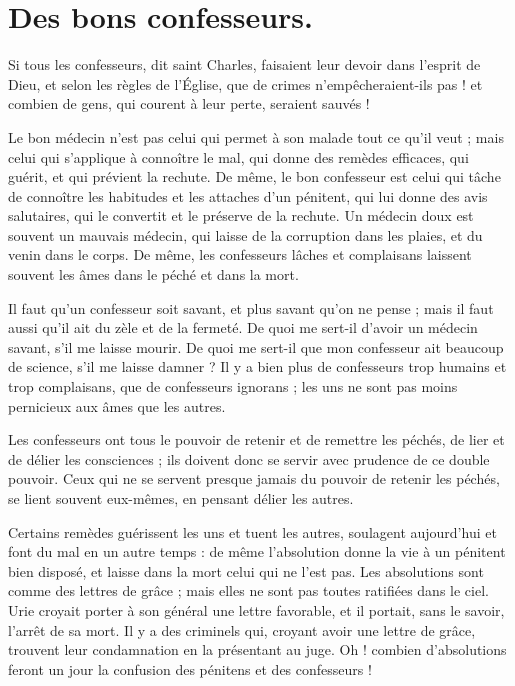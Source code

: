 \documentclass[instructions.tex]{subfiles}
\begin{document}
 
\chapter{Des bons confesseurs.}
 
\primo Si tous les confesseurs, dit saint Charles, faisaient leur devoir dans l’esprit de Dieu, et selon les règles de l’Église, que de crimes n’empêcheraient-ils pas ! et combien de gens, qui courent à leur perte, seraient sauvés !
 
Le bon médecin n’est pas celui qui permet à son malade tout ce qu’il veut ; mais celui qui s’applique à connoître le mal, qui donne des remèdes efficaces, qui guérit, et qui prévient la rechute. De même, le bon confesseur est celui qui tâche de connoître les habitudes et les attaches d’un pénitent, qui lui donne des avis salutaires, qui le convertit et le préserve de la rechute. Un médecin doux est souvent un mauvais médecin, qui laisse de la corruption dans les plaies, et du venin dans le corps. De même, les confesseurs lâches et complaisans laissent souvent les âmes dans le péché et dans la mort.
 
Il faut qu’un confesseur soit savant, et plus savant qu’on ne pense ; mais il faut aussi qu’il ait du zèle et de la fermeté. De quoi me sert-il d’avoir un médecin savant, s’il me laisse mourir. De quoi me sert-il que mon confesseur ait beaucoup de science, s’il me laisse damner ? Il y a bien plus de confesseurs trop humains et trop complaisans, que de confesseurs ignorans ; les uns ne sont pas moins pernicieux aux âmes que les autres.
 
\secundo Les confesseurs ont tous le pouvoir de retenir et de remettre les péchés, de lier et de délier les consciences ; ils doivent donc se servir avec prudence de ce double pouvoir. Ceux qui ne se servent presque jamais du pouvoir de retenir les péchés, se lient souvent eux-mêmes, en pensant délier les autres.
 
Certains remèdes guérissent les uns et tuent les autres, soulagent aujourd’hui et font du mal en un autre temps : de même l’absolution donne la vie à un pénitent bien disposé, et laisse dans la mort celui qui ne l’est pas. Les absolutions sont comme des lettres de grâce ; mais elles ne sont pas toutes ratifiées dans le ciel. Urie croyait porter à son général une lettre favorable, et il portait, sans le savoir, l’arrêt de sa mort. Il y a des criminels qui, croyant avoir une lettre de grâce, trouvent leur condamnation en la présentant au juge. Oh ! combien d’absolutions feront un jour la confusion des pénitens et des confesseurs !
 
\end{document}
